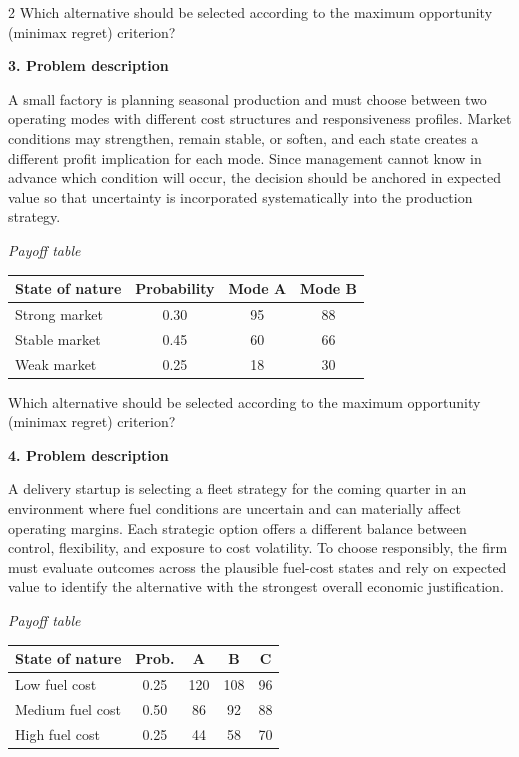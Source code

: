 \documentclass[12pt]{article}
\newcommand{\SubsectionBox}[1]{%
	\noindent\colorbox{gray!30}{%
		\parbox{\linewidth}{\textbf{#1}}%
	}\par\vspace{0.35cm}%
}
\begin{document}
\begin{multicols}{2}
				Which alternative should be selected according to the maximum opportunity (minimax regret) criterion?

		\vspace{0.25cm}
		\SubsectionBox{3. Problem description}\vspace{-0.25cm}
		A small factory is planning seasonal production and must choose between two operating modes with different cost structures and responsiveness profiles. Market conditions may strengthen, remain stable, or soften, and each state creates a different profit implication for each mode. Since management cannot know in advance which condition will occur, the decision should be anchored in expected value so that uncertainty is incorporated systematically into the production strategy.
		
				\begin{center}
					\textit{Payoff table} \par
					\begin{tabular}{l c c c}
						\toprule
						State of nature & Probability & Mode A & Mode B \\
						\midrule
						Strong market & 0.30 & 95 & 88 \\
						Stable market & 0.45 & 60 & 66 \\
						Weak market & 0.25 & 18 & 30 \\
						\bottomrule
					\end{tabular}
				\end{center}
		
				Which alternative should be selected according to the maximum opportunity (minimax regret) criterion?

		\vspace{0.25cm}
		\SubsectionBox{4. Problem description}\vspace{-0.25cm}
		A delivery startup is selecting a fleet strategy for the coming quarter in an environment where fuel conditions are uncertain and can materially affect operating margins. Each strategic option offers a different balance between control, flexibility, and exposure to cost volatility. To choose responsibly, the firm must evaluate outcomes across the plausible fuel-cost states and rely on expected value to identify the alternative with the strongest overall economic justification.
		
				\begin{center}
					\textit{Payoff table} \par
					\begin{tabular}{l c c c c}
						\toprule
						State of nature & Prob. & A & B & C \\
						\midrule
						Low fuel cost & 0.25 & 120 & 108 & 96 \\
						Medium fuel cost & 0.50 & 86 & 92 & 88 \\
						High fuel cost & 0.25 & 44 & 58 & 70 \\
						\bottomrule
					\end{tabular}
				\end{center}
		

\end{multicols}
\end{document}
